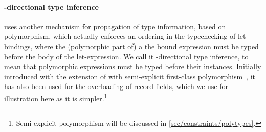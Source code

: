 \documentclass[acmsmall,screen,nonacm]{acmart}
\begin{document}
\paragraph{\Geninst-directional type inference}

\OCaml uses another mechanism for propagation of type information,
based on polymorphism, which actually enforces an ordering in the
typechecking of let-bindings, where the (polymorphic part of) a the
bound expression must be typed before the body of the let-expression.
We call it \textbf{\geninst}-directional type inference, to mean that
polymorphic expressions must be typed before their
instances.  Initially introduced with the extension of \ML with
semi-explicit first-class polymorphism~\cite {Garrigue-Remy/poly-ml},
it has also been used for the overloading of record fields, which we
use for illustration here as it is simpler.\footnote {Semi-explicit
  polymorphism will be discussed in \cref{sec/constraints/polytypes}.}
\end{document}
